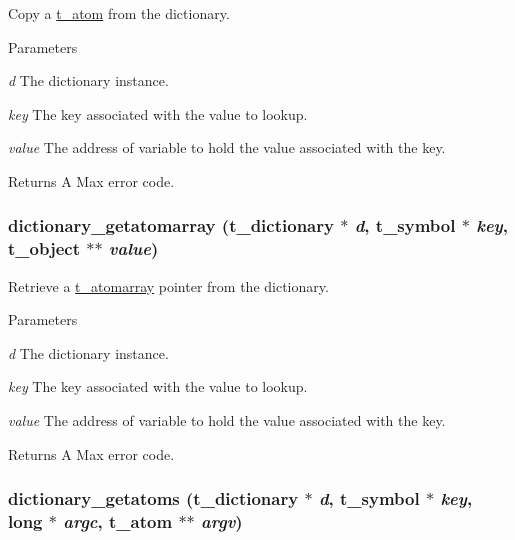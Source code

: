 Copy a \hyperlink{structt__atom}{t\_\-atom} from the dictionary. 
\begin{DoxyParams}{Parameters}
\item[{\em d}]The dictionary instance. \item[{\em key}]The key associated with the value to lookup. \item[{\em value}]The address of variable to hold the value associated with the key. \end{DoxyParams}
\begin{DoxyReturn}{Returns}
A Max error code. 
\end{DoxyReturn}
\hypertarget{group__dictionary_gabc3bc4db8dc0898593722338262743e1}{
\subsubsection[{dictionary\_\-getatomarray}]{ dictionary\_\-getatomarray ({\bf t\_\-dictionary} $\ast$ {\em d}, \/  {\bf t\_\-symbol} $\ast$ {\em key}, \/  {\bf t\_\-object} $\ast$$\ast$ {\em value})}}
\label{group__dictionary_gabc3bc4db8dc0898593722338262743e1}


Retrieve a \hyperlink{structt__atomarray}{t\_\-atomarray} pointer from the dictionary. 
\begin{DoxyParams}{Parameters}
\item[{\em d}]The dictionary instance. \item[{\em key}]The key associated with the value to lookup. \item[{\em value}]The address of variable to hold the value associated with the key. \end{DoxyParams}
\begin{DoxyReturn}{Returns}
A Max error code. 
\end{DoxyReturn}
\hypertarget{group__dictionary_gacda8208be5d424b81387258098bdbaa1}{
\subsubsection[{dictionary\_\-getatoms}]{ dictionary\_\-getatoms ({\bf t\_\-dictionary} $\ast$ {\em d}, \/  {\bf t\_\-symbol} $\ast$ {\em key}, \/  long $\ast$ {\em argc}, \/  {\bf t\_\-atom} $\ast$$\ast$ {\em argv})}}
\label{group__dictionary_gacda8208be5d424b81387258098bdbaa1}


